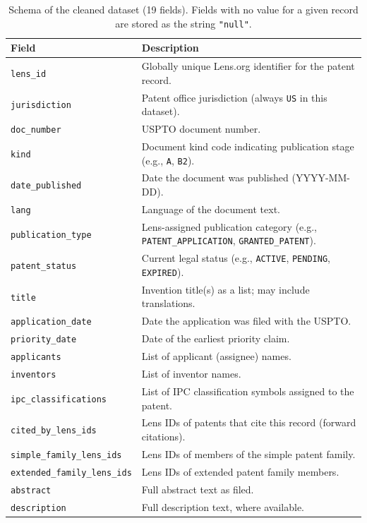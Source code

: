 \documentclass[11pt]{article}
\begin{document}
\begin{table}[h]
  \centering
  \small
  \begin{tabular}{p{4.8cm} p{7.5cm}}
    \toprule
    \textbf{Field} & \textbf{Description} \\
    \midrule
    \texttt{lens\_id}              & Globally unique Lens.org identifier for the patent record. \\
    \texttt{jurisdiction}          & Patent office jurisdiction (always \texttt{US} in this dataset). \\
    \texttt{doc\_number}           & USPTO document number. \\
    \texttt{kind}                  & Document kind code indicating publication stage (e.g., \texttt{A}, \texttt{B2}). \\
    \texttt{date\_published}       & Date the document was published (YYYY-MM-DD). \\
    \texttt{lang}                  & Language of the document text. \\
    \texttt{publication\_type}     & Lens-assigned publication category (e.g., \texttt{PATENT\_APPLICATION}, \texttt{GRANTED\_PATENT}). \\
    \texttt{patent\_status}        & Current legal status (e.g., \texttt{ACTIVE}, \texttt{PENDING}, \texttt{EXPIRED}). \\
    \texttt{title}                 & Invention title(s) as a list; may include translations. \\
    \texttt{application\_date}     & Date the application was filed with the USPTO. \\
    \texttt{priority\_date}        & Date of the earliest priority claim. \\
    \texttt{applicants}            & List of applicant (assignee) names. \\
    \texttt{inventors}             & List of inventor names. \\
    \texttt{ipc\_classifications}  & List of IPC classification symbols assigned to the patent. \\
    \texttt{cited\_by\_lens\_ids}  & Lens IDs of patents that cite this record (forward citations). \\
    \texttt{simple\_family\_lens\_ids}   & Lens IDs of members of the simple patent family. \\
    \texttt{extended\_family\_lens\_ids} & Lens IDs of extended patent family members. \\
    \texttt{abstract}              & Full abstract text as filed. \\
    \texttt{description}           & Full description text, where available. \\
    \bottomrule
  \end{tabular}
  \caption{Schema of the cleaned dataset (19 fields). Fields with no value for a given
  record are stored as the string \texttt{"null"}.}
  \label{tab:schema}
\end{table}
\end{document}
